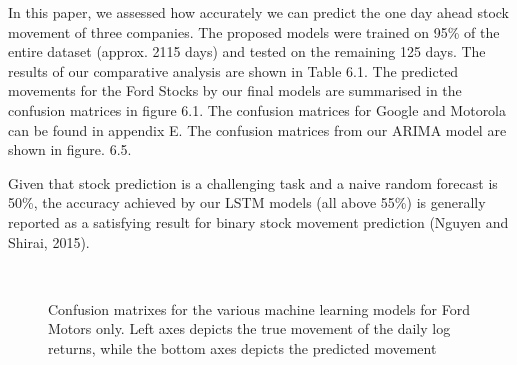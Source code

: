 In this paper, we assessed how accurately we can predict the one day ahead stock movement of three companies. The proposed models were trained on 95\% of the entire dataset (approx. 2115 days) and tested on the remaining 125 days. The results of our comparative analysis are shown in Table 6.1. The predicted movements for the Ford Stocks by our final models are summarised in the confusion matrices in figure 6.1. The confusion matrices for Google and Motorola can be found in appendix E. The confusion matrices from our ARIMA model are shown in figure. 6.5. 

Given that stock prediction is a challenging task and a naive random forecast is 50\%, the accuracy achieved by our LSTM models (all above 55\%) is generally reported as a satisfying result for binary stock movement prediction (Nguyen and Shirai, 2015). 

\begin{figure}[h]
    \centering
     \\
    \caption{\small{Confusion matrixes for the various machine learning models for Ford Motors only. Left axes depicts the true movement of the daily log returns, while the bottom axes depicts the predicted movement}}
\label{}
\end{figure}


